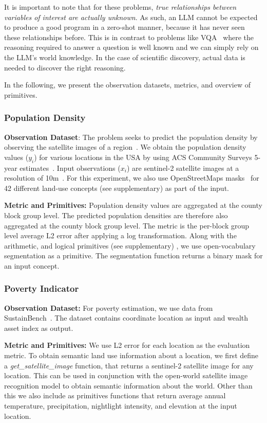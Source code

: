 It is important to note that for these problems, \emph{true relationships between variables of interest are actually unknown}.
As such, an LLM cannot be expected to produce a good program in a zero-shot manner, because it has never seen these relationships before.
This is in contrast to problems like VQA~\cite{suris-23} where the reasoning required to answer a question is well known and we can simply rely on the LLM's world knowledge.
In the case of scientific discovery, actual data is needed to discover the right reasoning.

In the following, we present the observation datasets, metrics, and overview of primitives. 

\subsubsection{Population Density}

\textbf{Observation Dataset}: 
The problem seeks to predict the population density by observing the satellite images of a region~\citep{metzger-22,metzger-24}. 
We obtain the population density values ($y_i$) for various locations in the USA by using ACS Community Surveys 5-year estimates~\citep{acs2024}.
Input observations ($x_i$) are sentinel-2 satellite images at a resolution of 10m~\citep{drusch2012sentinel}. For this experiment, we also use OpenStreetMaps masks~\citep{vargas2020osm} for 42 different land-use concepts (see supplementary) as part of the input.

\textbf{Metric and Primitives:} 
Population density values are aggregated at the county block group level. The predicted population densities are therefore also aggregated at the county block group level. The metric is the per-block group level average L2 error after applying a log transformation.
Along with the arithmetic, and logical primitives (see supplementary)
, we use open-vocabulary segmentation as a primitive.
The segmentation function returns a binary mask for an input concept. 



\subsubsection{Poverty Indicator}
\textbf{Observation Dataset:} For poverty estimation, we use data from SustainBench~\citep{yeh2021sustainbench}. 
The dataset contains coordinate location as input and wealth asset index as output.

\textbf{Metric and Primitives:} We use L2 error for each location as the evaluation metric. To obtain semantic land use information about a location, we first define a \emph{get\_satellite\_image} function, that returns a sentinel-2 satellite image for any location. This can be used in conjunction with the open-world satellite image recognition model to obtain semantic information about the world. 
Other than this we also include as primitives functions that return average annual temperature, precipitation, nightlight intensity, and elevation at the input location. 

